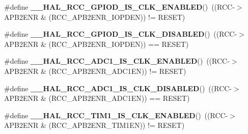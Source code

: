 \begin{DoxyCompactItemize}
\#define {\bfseries \+\_\+\+\_\+\+H\+A\+L\+\_\+\+R\+C\+C\+\_\+\+G\+P\+I\+O\+D\+\_\+\+I\+S\+\_\+\+C\+L\+K\+\_\+\+E\+N\+A\+B\+L\+ED}()~((R\+CC-\/$>$A\+P\+B2\+E\+NR \& (R\+C\+C\+\_\+\+A\+P\+B2\+E\+N\+R\+\_\+\+I\+O\+P\+D\+EN)) != R\+E\+S\+ET)
\item 
\mbox{\label{group___r_c_c___a_p_b2___peripheral___clock___enable___disable___status_ga01c2b4166bbcf59a529cd3c5f8b93d76}} 
\#define {\bfseries \+\_\+\+\_\+\+H\+A\+L\+\_\+\+R\+C\+C\+\_\+\+G\+P\+I\+O\+D\+\_\+\+I\+S\+\_\+\+C\+L\+K\+\_\+\+D\+I\+S\+A\+B\+L\+ED}()~((R\+CC-\/$>$A\+P\+B2\+E\+NR \& (R\+C\+C\+\_\+\+A\+P\+B2\+E\+N\+R\+\_\+\+I\+O\+P\+D\+EN)) == R\+E\+S\+ET)
\item 
\mbox{\label{group___r_c_c___a_p_b2___peripheral___clock___enable___disable___status_ga66eb89f7d856d9107e814efc751e8996}} 
\#define {\bfseries \+\_\+\+\_\+\+H\+A\+L\+\_\+\+R\+C\+C\+\_\+\+A\+D\+C1\+\_\+\+I\+S\+\_\+\+C\+L\+K\+\_\+\+E\+N\+A\+B\+L\+ED}()~((R\+CC-\/$>$A\+P\+B2\+E\+NR \& (R\+C\+C\+\_\+\+A\+P\+B2\+E\+N\+R\+\_\+\+A\+D\+C1\+EN)) != R\+E\+S\+ET)
\item 
\mbox{\label{group___r_c_c___a_p_b2___peripheral___clock___enable___disable___status_gac9f006a3c1b75c06270f0ae5a2c3ed07}} 
\#define {\bfseries \+\_\+\+\_\+\+H\+A\+L\+\_\+\+R\+C\+C\+\_\+\+A\+D\+C1\+\_\+\+I\+S\+\_\+\+C\+L\+K\+\_\+\+D\+I\+S\+A\+B\+L\+ED}()~((R\+CC-\/$>$A\+P\+B2\+E\+NR \& (R\+C\+C\+\_\+\+A\+P\+B2\+E\+N\+R\+\_\+\+A\+D\+C1\+EN)) == R\+E\+S\+ET)
\item 
\mbox{\label{group___r_c_c___a_p_b2___peripheral___clock___enable___disable___status_gad2b7c3a381d791c4ee728e303935832a}} 
\#define {\bfseries \+\_\+\+\_\+\+H\+A\+L\+\_\+\+R\+C\+C\+\_\+\+T\+I\+M1\+\_\+\+I\+S\+\_\+\+C\+L\+K\+\_\+\+E\+N\+A\+B\+L\+ED}()~((R\+CC-\/$>$A\+P\+B2\+E\+NR \& (R\+C\+C\+\_\+\+A\+P\+B2\+E\+N\+R\+\_\+\+T\+I\+M1\+EN)) != R\+E\+S\+ET)
\item 
\mbox{\label{group___r_c_c___a_p_b2___peripheral___clock___enable___disable___status_ga7116893adbb7fc144102af49de55350b}} 

\end{DoxyCompactItemize}
